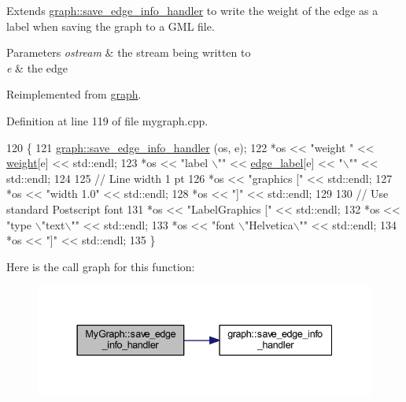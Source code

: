 Extends \mbox{\hyperlink{classgraph_a37bb8d0951691e37cdfb271229960f9c}{graph\+::save\+\_\+edge\+\_\+info\+\_\+handler}} to write the weight of the edge as a label when saving the graph to a G\+ML file. 
\begin{DoxyParams}{Parameters}
{\em ostream} & the stream being written to \\
\hline
{\em e} & the edge \\
\hline
\end{DoxyParams}


Reimplemented from \mbox{\hyperlink{classgraph_a37bb8d0951691e37cdfb271229960f9c}{graph}}.



Definition at line 119 of file mygraph.\+cpp.


\begin{DoxyCode}
120 \{
121     \mbox{\hyperlink{classgraph_a37bb8d0951691e37cdfb271229960f9c}{graph::save\_edge\_info\_handler}} (os, e); 
122     *os << \textcolor{stringliteral}{"weight "} << \mbox{\hyperlink{class_my_graph_aa6e12f16153220780e9db1eb30112b34}{weight}}[e] << std::endl;
123     *os << \textcolor{stringliteral}{"label \(\backslash\)""} << \mbox{\hyperlink{class_my_graph_ac87b3f22352ddc7ec3864173a0d69cdd}{edge\_label}}[e] << \textcolor{stringliteral}{"\(\backslash\)""} << std::endl;
124 
125     \textcolor{comment}{// Line width 1 pt}
126     *os << \textcolor{stringliteral}{"graphics ["} << std::endl;
127     *os << \textcolor{stringliteral}{"width 1.0"} << std::endl;
128     *os << \textcolor{stringliteral}{"]"} << std::endl;
129     
130     \textcolor{comment}{// Use standard Postscript font}
131     *os << \textcolor{stringliteral}{"LabelGraphics ["} << std::endl;
132     *os << \textcolor{stringliteral}{"type \(\backslash\)"text\(\backslash\)""} << std::endl;
133     *os << \textcolor{stringliteral}{"font \(\backslash\)"Helvetica\(\backslash\)""} << std::endl;
134     *os << \textcolor{stringliteral}{"]"} << std::endl;
135 \}
\end{DoxyCode}
Here is the call graph for this function\+:
\nopagebreak
\begin{figure}[H]
\begin{center}
\leavevmode
\includegraphics[width=337pt]{class_my_graph_aa2c8ff76d5443d4788ecfebc8f799182_cgraph}
\end{center}
\end{figure}
\mbox{\label{classgraph_a0f20022d6f4951b8836a204aa85b7693}} 
